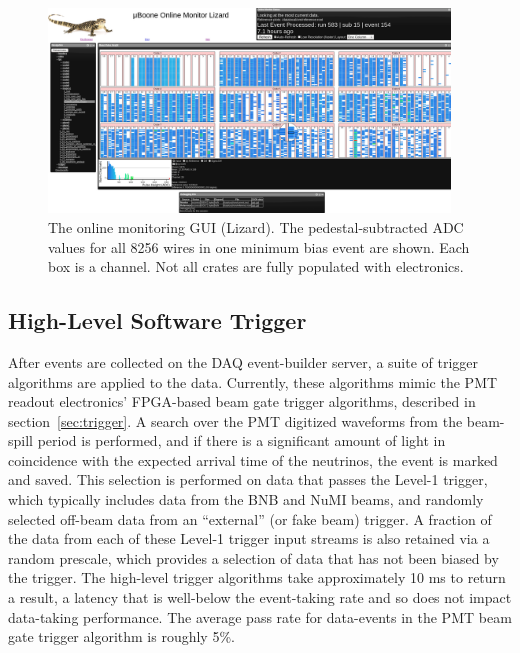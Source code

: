 \begin{figure}
\centering
\includegraphics[width=0.95\textwidth]{./figures/daqLizard.png}
\caption{The online monitoring GUI (Lizard). The pedestal-subtracted ADC values for all 8256 wires in one minimum bias event are shown. Each box is a channel. Not all crates are fully populated with electronics. }
\label{fig:onlinemonitor}
\end{figure}

\subsection{High-Level Software Trigger}
\label{sec:software-trigger}
After events are collected on the DAQ event-builder server, a suite of trigger algorithms are applied to the data. Currently, these algorithms mimic the PMT readout electronics' FPGA-based beam gate trigger algorithms, described in section~\ref{sec:trigger}. A search over the PMT digitized waveforms from the beam-spill period is performed, and if there is a significant amount of light in coincidence with the expected arrival time of the neutrinos, the event is marked and saved. This selection is performed on data that passes the Level-1 trigger, which typically includes data from the BNB and NuMI beams, and randomly selected off-beam data from an ``external'' (or fake beam) trigger. A fraction of the data from each of these Level-1 trigger input streams is also retained via a random prescale, which provides a selection of data that has not been biased by the trigger. The high-level trigger algorithms take approximately 10 ms to return a result, a latency that is well-below the event-taking rate and so does not impact data-taking performance. The average pass rate for data-events in the PMT beam gate trigger algorithm is roughly 5\%. 




